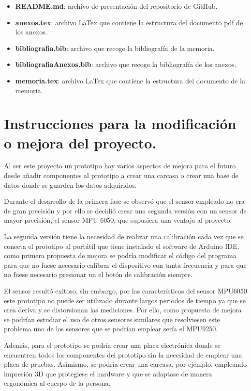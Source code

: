 \begin{itemize}
    \item \textbf{README.md}: archivo de presentación del repositorio de GitHub\cite{GitHub}.
    \item \textbf{anexos.tex}: archivo LaTex que contiene la estructura del documento pdf de los anexos.
    \item \textbf{bibliografia.bib}: archivo que recoge la bibliografía de la memoria.
    \item \textbf{bibliografiaAnexos.bib}: archivo que recoge la bibliografía de los anexos.
    \item \textbf{memoria.tex}: archivo LaTex que contiene la estructura del documento de la memoria.
\end{itemize}


\section{Instrucciones para la modificación o mejora del proyecto.}

Al ser este proyecto un prototipo hay varios aspectos de mejora para el futuro desde añadir componentes al prototipo a crear una carcasa o crear una base de datos donde se guarden los datos adquiridos.

Durante el desarrollo de la primera fase se observó que el sensor empleado no era de gran precisión y por ello se decidió crear una segunda versión con un sensor de mayor precisión, el sensor MPU-6050\cite{MPU6050_1,MPU6050_2}, que supusiera una ventaja al proyecto. 

La segunda versión tiene la necesidad de realizar una calibración cada vez que se conecta el prototipo al portátil que tiene instalado el software de Arduino IDE\cite{ArduinoIDE}, como primera propuesta de mejora se podría modificar el código del programa para que no fuese necesario calibrar el dispositivo con tanta frecuencia y para que no fuese necesario presionar un el botón de calibración siempre.

El sensor resultó exitoso, sin embargo, por las características del sensor MPU6050 este prototipo no puede ser utilizado durante largos periodos de tiempo ya que se crea deriva y se distorsionan las mediciones. Por ello, como propuesta de mejora se podrían estudiar el uso de otros sensores similares que resolviesen este problema uno de los sensores que se podrían emplear sería el MPU9250\cite{MPU9250_1,MPU9250_2}.

Además, para el prototipo se podría crear una placa electrónica donde se encuentren todos los componentes del prototipo sin la necesidad de emplear una placa de pruebas. Asimismo, se podría crear una carcasa, por ejemplo, empleando impresión 3D que protegiese el hardware y que se adaptase de manera ergonómica al cuerpo de la persona.

